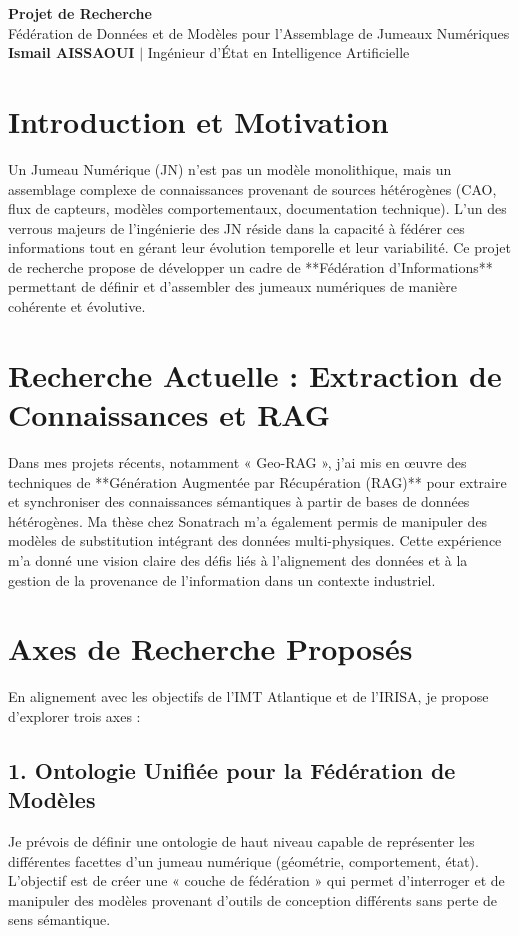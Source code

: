 \documentclass[11pt,a4paper]{article}
\begin{document}
\begin{center}
    {\LARGE\bfseries\color{titleblue} Projet de Recherche}\\[6pt]
    {\large Fédération de Données et de Modèles pour l'Assemblage de Jumeaux Numériques}\\[4pt]
    \textbf{Ismail AISSAOUI} $|$ Ingénieur d'État en Intelligence Artificielle
\end{center}

\bigskip

\section{Introduction et Motivation}
Un Jumeau Numérique (JN) n'est pas un modèle monolithique, mais un assemblage complexe de connaissances provenant de sources hétérogènes (CAO, flux de capteurs, modèles comportementaux, documentation technique). L'un des verrous majeurs de l'ingénierie des JN réside dans la capacité à fédérer ces informations tout en gérant leur évolution temporelle et leur variabilité. Ce projet de recherche propose de développer un cadre de **Fédération d'Informations** permettant de définir et d'assembler des jumeaux numériques de manière cohérente et évolutive.

\section{Recherche Actuelle : Extraction de Connaissances et RAG}
Dans mes projets récents, notamment « Geo-RAG », j'ai mis en œuvre des techniques de **Génération Augmentée par Récupération (RAG)** pour extraire et synchroniser des connaissances sémantiques à partir de bases de données hétérogènes. Ma thèse chez Sonatrach m'a également permis de manipuler des modèles de substitution intégrant des données multi-physiques. Cette expérience m'a donné une vision claire des défis liés à l'alignement des données et à la gestion de la provenance de l'information dans un contexte industriel.

\section{Axes de Recherche Proposés}
En alignement avec les objectifs de l'IMT Atlantique et de l'IRISA, je propose d'explorer trois axes :

\subsection{1. Ontologie Unifiée pour la Fédération de Modèles}
Je prévois de définir une ontologie de haut niveau capable de représenter les différentes facettes d'un jumeau numérique (géométrie, comportement, état). L'objectif est de créer une « couche de fédération » qui permet d'interroger et de manipuler des modèles provenant d'outils de conception différents sans perte de sens sémantique.
\end{document}
